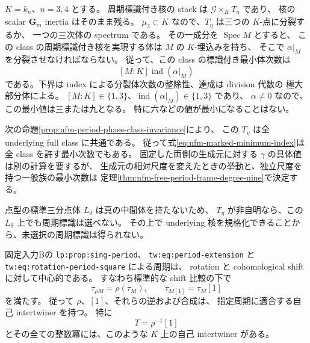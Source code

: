 \begin{remark}
\label{rem:nfm-full-kernel-period-nine}
$K=k_n$、$n=3,4$ とする。
周期標識付き核の stack は $\mathcal G\times_KT_\eta$ であり、
核の scalar $\mathbf G_m$ inertia はそのまま残る。
$\mu_3\subset K$ なので、$T_\eta$ は三つの $K$-点に分裂するか、
一つの三次体の spectrum である。
その一成分を $\operatorname{Spec}M$ とすると、
この class の周期標識付き核を実現する体は $M$ の $K$-埋込みを持ち、
そこで $\alpha|_M$ を分裂させなければならない。
従って、この class の標識付き最小体次数は
\begin{equation}\label{eq:nfm-marked-minimum-index}
 [M:K]\operatorname{ind}(\alpha|_M)
\end{equation}
である。下界は index による分裂体次数の整除性、達成は division 代数の
極大部分体による。
$[M:K]\in\{1,3\}$、$\operatorname{ind}(\alpha|_M)\in\{1,3\}$ であり、
$\alpha\ne0$ なので、この最小値は三または九となる。
特に六などの値が最小になることはない。

次の命題\ref{prop:nfm-period-phase-class-invariance}により、
この $T_\eta$ は全 underlying full class に共通である。
従って式\eqref{eq:nfm-marked-minimum-index}は全 class を許す最小次数でもある。
固定した両側の生成元に対する $\gamma$ の具体値は別の計算を要するが、
生成元の相対尺度を変えたときの挙動と、独立尺度を持つ一般族の最小次数は
定理\ref{thm:nfm-free-period-frame-degree-nine}で決定する。

点型の標準三分点体 $L_9$ は真の中間体を持たないため、
$T_\eta$ が非自明なら、この $L_9$ 上でも周期標識は選べない。
その上で underlying 核を規格化できることから、未選択の周期標識は得られない。
\end{remark}

\begin{lemma}
\label{lem:nfm-mf-period-central-coherence}
固定入力Bの \texttt{lp:prop:sing-period}、
\texttt{tw:eq:period-extension} と
\texttt{tw:eq:rotation-period-square} による周期は、
rotation と cohomological shift に対して中心的である。
すなわち標準的な shift 比較の下で
\[
 \tau_{\rho M}=\rho(\tau_M),\qquad
 \tau_{M[1]}=\tau_M[1]
\]
を満たす。
従って $\rho$、$[1]$、それらの逆および合成は、
指定周期に適合する自己 intertwiner を持つ。
特に
\[
 T=\rho^{-1}[1]
\]
とその全ての整数冪には、このような $K$ 上の自己 intertwiner がある。
\end{lemma}

